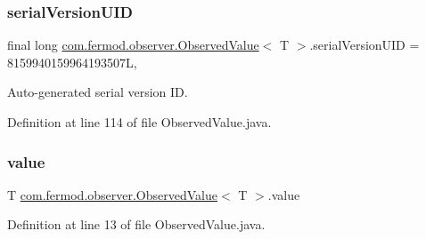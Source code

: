 \subsubsection{\texorpdfstring{serialVersionUID}{serialVersionUID}}
{\footnotesize\ttfamily final long \mbox{\hyperlink{classcom_1_1fermod_1_1observer_1_1ObservedValue}{com.\+fermod.\+observer.\+Observed\+Value}}$<$ T $>$.serial\+Version\+U\+ID = 8159940159964193507L\hspace{0.3cm}{\ttfamily [static]}, {\ttfamily [private]}}



Auto-\/generated serial version ID. 



Definition at line 114 of file Observed\+Value.\+java.

\mbox{\label{classcom_1_1fermod_1_1observer_1_1ObservedValue_a947edfec1982817155067f495b0c8cf7}} 
\subsubsection{\texorpdfstring{value}{value}}
{\footnotesize\ttfamily T \mbox{\hyperlink{classcom_1_1fermod_1_1observer_1_1ObservedValue}{com.\+fermod.\+observer.\+Observed\+Value}}$<$ T $>$.value\hspace{0.3cm}{\ttfamily [private]}}



Definition at line 13 of file Observed\+Value.\+java.

